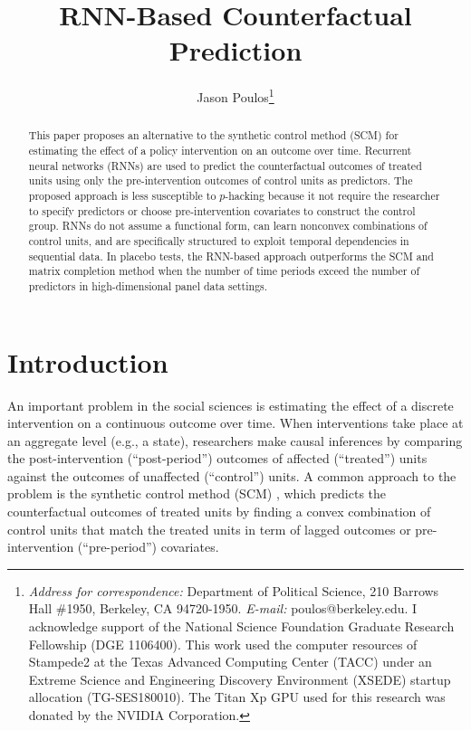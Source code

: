 \documentclass[hidelinks,12pt]{article}
\title{RNN-Based Counterfactual Prediction}
\author[ ]{Jason Poulos\thanks{\emph{Address for correspondence:} Department of Political Science, 210 Barrows Hall \#1950, Berkeley, CA 94720-1950. \emph{E-mail:} poulos@berkeley.edu. I acknowledge support of the National Science Foundation Graduate Research Fellowship (DGE 1106400). This work used the computer resources of Stampede2 at the Texas Advanced Computing Center (TACC) under an Extreme Science and Engineering Discovery Environment (XSEDE) startup allocation (TG-SES180010). The Titan Xp GPU used for this research was donated by the NVIDIA Corporation.}}
\affil[ ]{University of California, Berkeley}
\date{}
\begin{document}
 
 
\begin{singlespacing}
\maketitle  
\end{singlespacing}
\thispagestyle{empty}

\begin{abstract}  %
\noindent 
This paper proposes an alternative to the synthetic control method (SCM) for estimating the effect of a policy intervention on an outcome over time. Recurrent neural networks (RNNs) are used to predict the counterfactual outcomes of treated units using only the pre-intervention outcomes of control units as predictors. The proposed approach is less susceptible to $p$-hacking because it not require the researcher to specify predictors or choose pre-intervention covariates to construct the control group. RNNs do not assume a functional form, can learn nonconvex combinations of control units, and are specifically structured to exploit temporal dependencies in sequential data. In placebo tests, the RNN-based approach outperforms the SCM and matrix completion method when the number of time periods exceed the number of predictors in high-dimensional panel data settings. 
\end{abstract}

\pagebreak
{}%

\section{Introduction} 

An important problem in the social sciences is estimating the effect of a discrete intervention on a continuous outcome over time. When interventions take place at an aggregate level (e.g., a state), researchers make causal inferences by comparing the post-intervention (``post-period'') outcomes of affected (``treated'') units against the outcomes of unaffected  (``control'') units. A common approach to the problem is the synthetic control method (SCM) \citep{abadie2010synthetic}, which predicts the counterfactual outcomes of treated units by finding a convex combination of control units that match the treated units in term of lagged outcomes or pre-intervention (``pre-period'') covariates. 
\end{document}

